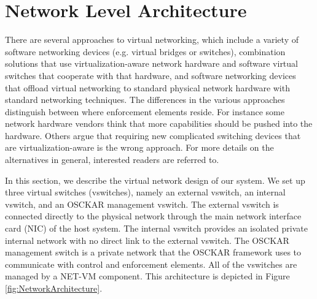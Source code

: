 \section{Network Level Architecture}
\label{sec:NetworkArchitecture}

There are several approaches to virtual networking, which include a variety of software networking devices (e.g. virtual bridges or switches), combination solutions that use virtualization-aware network hardware and software virtual switches that cooperate with that hardware, and software networking devices that offload virtual networking to standard physical network hardware with standard networking techniques. The differences in the various approaches distinguish between where enforcement elements reside. For instance some network hardware vendors think that more capabilities should be pushed into the hardware. Others argue that requiring new complicated switching devices that are virtualization-aware is the wrong approach. For more details on the alternatives in general, interested readers are referred to\cite{ovs_hotnets_2009, casado_hotnets_2008, cisco_nexus_website, vepa_2008, vntag_2008, vmware_vNetwork_Distributed_Switch_website}.

In this section, we describe the virtual network design of our system. We set up three virtual switches (vswitches), namely an external vswitch, an internal vswitch, and an OSCKAR management vswitch. The external vswitch is connected directly to the physical network through the main network interface card (NIC) of the host system. The internal vswitch provides an isolated private internal network with no direct link to the external vswitch. The OSCKAR management switch is a private network that the OSCKAR framework uses to communicate with control and enforcement elements. All of the vswitches are managed by a NET-VM component. This architecture is depicted in Figure \ref{fig:NetworkArchitecture}.

